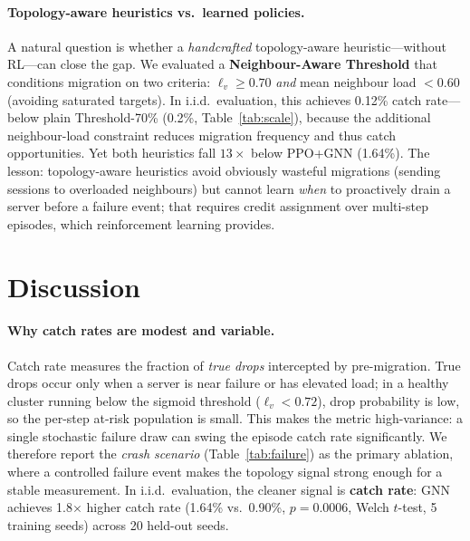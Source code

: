 \documentclass[review,1p]{elsarticle}
\theoremstyle{definition}
\begin{document}
\paragraph{Topology-aware heuristics vs.\ learned policies.}
A natural question is whether a \emph{handcrafted} topology-aware
heuristic---without RL---can close the gap.  We evaluated a
\textbf{Neighbour-Aware Threshold} that conditions migration on two criteria:
$\ell_v \geq 0.70$ \emph{and} mean neighbour load $< 0.60$ (avoiding
saturated targets).  In i.i.d.\ evaluation, this achieves 0.12\%
catch rate---below plain Threshold-70\% (0.2\%, Table~\ref{tab:scale}),
because the additional neighbour-load constraint reduces migration
frequency and thus catch opportunities.  Yet both heuristics fall $13\times$
below PPO+GNN (1.64\%).  The lesson: topology-aware
heuristics avoid obviously wasteful migrations (sending sessions to
overloaded neighbours) but cannot learn \emph{when} to proactively drain
a server before a failure event; that requires credit assignment over
multi-step episodes, which reinforcement learning provides.

\section{Discussion}
\label{sec:discussion}

\paragraph{Why catch rates are modest and variable.}
Catch rate measures the fraction of \emph{true drops} intercepted by
pre-migration.  True drops occur only when a server is near failure or
has elevated load; in a healthy cluster running below the sigmoid threshold
($\ell_v < 0.72$), drop probability is low, so the per-step at-risk
population is small.  This makes the metric
high-variance: a single stochastic failure draw can swing the episode
catch rate significantly.  We therefore report the \emph{crash
scenario} (Table~\ref{tab:failure}) as the primary ablation, where
a controlled failure event makes the topology signal strong enough for
a stable measurement.  In i.i.d.\ evaluation, the cleaner signal is
\textbf{catch rate}: GNN achieves 1.8$\times$ higher catch rate
(1.64\% vs.\ 0.90\%, $p{=}0.0006$, Welch $t$-test, 5 training seeds) across 20 held-out seeds.
\end{document}
